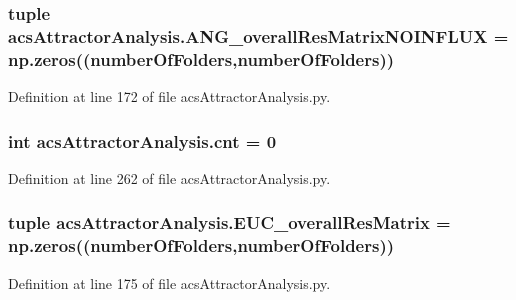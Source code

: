 \hypertarget{a00096_a0d0e0ed8583e4aa041fa6c122324311e}{
\subsubsection[{A\-N\-G\-\_\-overall\-Res\-Matrix\-N\-O\-I\-N\-F\-L\-U\-X}]{\setlength{\rightskip}{0pt plus 5cm}tuple acs\-Attractor\-Analysis.\-A\-N\-G\-\_\-overall\-Res\-Matrix\-N\-O\-I\-N\-F\-L\-U\-X = np.\-zeros(({\bf number\-Of\-Folders},{\bf number\-Of\-Folders}))}}\label{a00096_a0d0e0ed8583e4aa041fa6c122324311e}


Definition at line 172 of file acs\-Attractor\-Analysis.\-py.

\hypertarget{a00096_a8ec106a228fafb4c290946a7b7f8b6da}{
\subsubsection[{cnt}]{\setlength{\rightskip}{0pt plus 5cm}int acs\-Attractor\-Analysis.\-cnt = 0}}\label{a00096_a8ec106a228fafb4c290946a7b7f8b6da}


Definition at line 262 of file acs\-Attractor\-Analysis.\-py.

\hypertarget{a00096_a920167afed4efad8feefc27bdbadba89}{
\subsubsection[{E\-U\-C\-\_\-overall\-Res\-Matrix}]{\setlength{\rightskip}{0pt plus 5cm}tuple acs\-Attractor\-Analysis.\-E\-U\-C\-\_\-overall\-Res\-Matrix = np.\-zeros(({\bf number\-Of\-Folders},{\bf number\-Of\-Folders}))}}\label{a00096_a920167afed4efad8feefc27bdbadba89}


Definition at line 175 of file acs\-Attractor\-Analysis.\-py.

